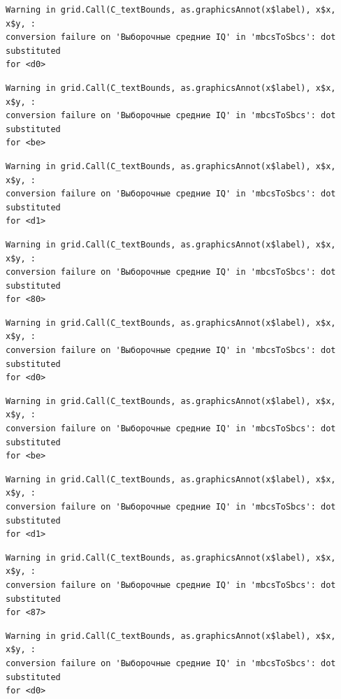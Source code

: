 \documentclass[
  letterpaper,
  DIV=11,
  numbers=noendperiod]{scrreprt}
\theoremstyle{definition}
\theoremstyle{remark}
\begin{document}
\begin{verbatim}
Warning in grid.Call(C_textBounds, as.graphicsAnnot(x$label), x$x, x$y, :
conversion failure on 'Выборочные средние IQ' in 'mbcsToSbcs': dot substituted
for <d0>
\end{verbatim}

\begin{verbatim}
Warning in grid.Call(C_textBounds, as.graphicsAnnot(x$label), x$x, x$y, :
conversion failure on 'Выборочные средние IQ' in 'mbcsToSbcs': dot substituted
for <be>
\end{verbatim}

\begin{verbatim}
Warning in grid.Call(C_textBounds, as.graphicsAnnot(x$label), x$x, x$y, :
conversion failure on 'Выборочные средние IQ' in 'mbcsToSbcs': dot substituted
for <d1>
\end{verbatim}

\begin{verbatim}
Warning in grid.Call(C_textBounds, as.graphicsAnnot(x$label), x$x, x$y, :
conversion failure on 'Выборочные средние IQ' in 'mbcsToSbcs': dot substituted
for <80>
\end{verbatim}

\begin{verbatim}
Warning in grid.Call(C_textBounds, as.graphicsAnnot(x$label), x$x, x$y, :
conversion failure on 'Выборочные средние IQ' in 'mbcsToSbcs': dot substituted
for <d0>
\end{verbatim}

\begin{verbatim}
Warning in grid.Call(C_textBounds, as.graphicsAnnot(x$label), x$x, x$y, :
conversion failure on 'Выборочные средние IQ' in 'mbcsToSbcs': dot substituted
for <be>
\end{verbatim}

\begin{verbatim}
Warning in grid.Call(C_textBounds, as.graphicsAnnot(x$label), x$x, x$y, :
conversion failure on 'Выборочные средние IQ' in 'mbcsToSbcs': dot substituted
for <d1>
\end{verbatim}

\begin{verbatim}
Warning in grid.Call(C_textBounds, as.graphicsAnnot(x$label), x$x, x$y, :
conversion failure on 'Выборочные средние IQ' in 'mbcsToSbcs': dot substituted
for <87>
\end{verbatim}

\begin{verbatim}
Warning in grid.Call(C_textBounds, as.graphicsAnnot(x$label), x$x, x$y, :
conversion failure on 'Выборочные средние IQ' in 'mbcsToSbcs': dot substituted
for <d0>
\end{verbatim}
\end{document}
